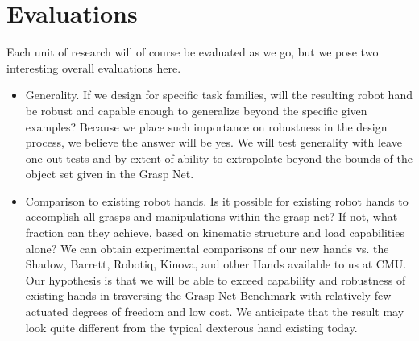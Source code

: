 \section{Evaluations}

Each unit of research will of course be evaluated as we go, but we pose two interesting overall evaluations here.

\begin{itemize}

  \item Generality.   If we design for specific task families, will the resulting robot hand be robust and capable enough to generalize beyond the specific given examples?   Because we place such importance on robustness in the design process, we believe the answer will be yes.   We will test generality with leave one out tests and by extent of ability to extrapolate beyond the bounds of the object set given in the Grasp Net.

  \item Comparison to existing robot hands.    Is it possible for existing robot hands to accomplish all grasps and manipulations within the grasp net?   If not, what fraction can they achieve, based on kinematic structure and load capabilities alone?    We can obtain experimental comparisons of our new hands vs. the Shadow, Barrett, Robotiq, Kinova, and other Hands available to us at CMU.   Our hypothesis is that we will be able to exceed capability and robustness of existing hands in traversing the Grasp Net Benchmark with relatively few actuated degrees of freedom and low cost.   We anticipate that the result may look quite different from the typical dexterous hand existing today.

\end{itemize}